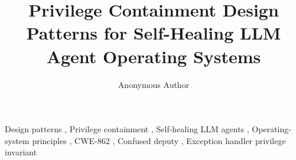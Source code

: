 \documentclass[review,3p,authoryear]{elsarticle}
\begin{document}
\begin{frontmatter}

    \title{Privilege Containment Design Patterns for Self-Healing LLM Agent Operating Systems}

    \author{Anonymous Author}
    \address{Anonymous Affiliation}

    

    \begin{keyword}
        Design patterns \sep
        Privilege containment \sep
        Self-healing LLM agents \sep
        Operating-system principles \sep
        CWE-862 \sep
        Confused deputy \sep
        Exception handler privilege invariant
    \end{keyword}
\end{frontmatter}












\end{document}
